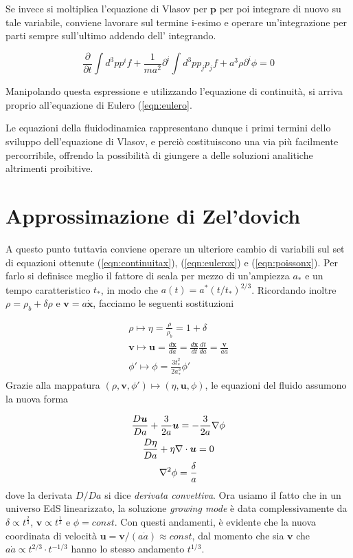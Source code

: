 Se invece si moltiplica l'equazione di Vlasov per $\bm{p}$ per poi integrare di nuovo su tale variabile, 
conviene lavorare sul termine i-esimo e operare un'integrazione per parti sempre sull'ultimo addendo dell'
integrando.

\begin{equation}
    \frac{\partial }{\partial t} \int d^3 p p^i f + \frac{1}{ma^2} \partial^i \int d^3 p p_j p_j f + a^3 \rho \partial^i \phi = 0 
\end{equation}

Manipolando questa espressione e utilizzando l'equazione di continuità, si arriva proprio all'equazione di Eulero
(\ref{eqn:eulero}.

Le equazioni della fluidodinamica rappresentano dunque i primi termini dello sviluppo dell'equazione di Vlasov,
e perciò costituiscono una via più facilmente percorribile, offrendo la possibilità di giungere a delle soluzioni
analitiche altrimenti proibitive.


\section{Approssimazione di Zel'dovich}

A questo punto tuttavia conviene operare un ulteriore cambio di variabili sul set di equazioni ottenute (\ref{eqn:continuitax}),
(\ref{eqn:eulerox}) e (\ref{eqn:poissonx}). Per farlo si definisce meglio il fattore di scala per mezzo di un'ampiezza $a_{*}$ e
un tempo caratteristico $t_{*}$, in modo che $a(t) = a^{*}(t / t_{*})^{2/3}$. Ricordando inoltre $\rho = \rho_b + \delta\rho$ e 
$\bm{v} = a \dot{\bm{x}}$, facciamo le seguenti sostituzioni

\begin{gather}
    \rho \mapsto \eta = \frac{\rho}{\rho_b} = 1 + \delta \\
    \bm{v} \mapsto \bm{u} = \frac{d\bm{x}}{da} = \frac{d\bm{x}}{dt}\frac{dt}{da} = \frac{\bm{v}}{a\dot{a}} \\
    \phi{'} \mapsto \phi = \frac{3t_{*}^2}{2a_{*}^3}\phi{'}
\end{gather}
Grazie alla mappatura $(\rho, \bm{v}, \phi{'})\mapsto(\eta, \bm{u}, \phi)$, le equazioni del fluido assumono
la nuova forma 

\begin{gather}
    \label{eqn:cont_tau}
    \frac{D\bm{u}}{Da} + \frac{3}{2a}\bm{u} = -\frac{3}{2a}\nabla\phi \\
    \frac{D\eta}{Da} + \eta \nabla \cdot \bm{u} = 0 \\
    \label{eqn:poisson_tau}
    \laplacian \phi = \frac{\delta}{a}
\end{gather}
dove la derivata $D/Da$ si dice \textit{derivata convettiva}.
Ora usiamo il fatto che in un universo EdS linearizzato, la soluzione \textit{growing mode} è data complessivamente
da  $\delta \propto t^{\frac{2}{3}}$, $\bm{v} \propto t^{\frac{1}{3}}$ e $\phi = const$. Con questi andamenti, è
evidente che la nuova coordinata di velocità $\bm{u} = \bm{v} / (a\dot{a}) \approx const$, dal momento che sia 
$\bm{v}$ che $a\dot{a} \propto t^{2/3} \cdot t^{-1/3}$ hanno lo stesso andamento $t^{1/3}$.

